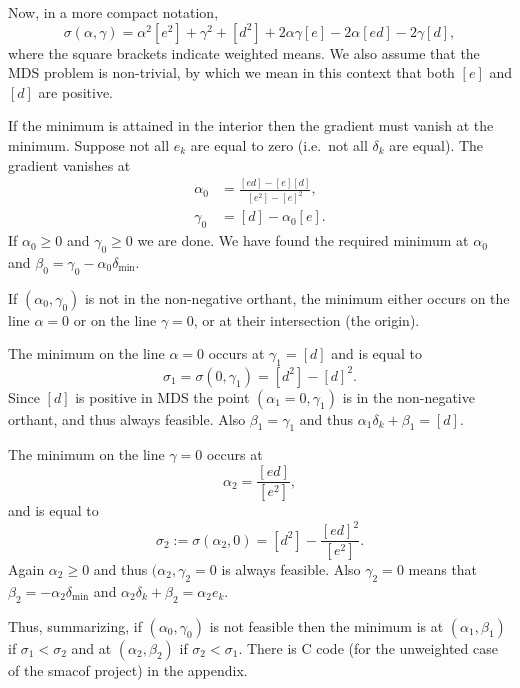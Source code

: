 \documentclass[
  12pt,
]{article}
\begin{document}
Now, in a more compact notation,
\begin{equation}
\sigma(\alpha,\gamma)=\alpha^2[e^2]+\gamma^2+[d^2]+2\alpha\gamma[e]-2\alpha[ed]-2\gamma[d],
\end{equation}
where the square brackets indicate weighted means. We also assume that the MDS problem is
non-trivial, by which we mean in this context that
both \([e]\) and \([d]\) are positive.

If the minimum is attained in the interior then the gradient
must vanish at the minimum. Suppose not all \(e_k\) are equal to zero
(i.e.~not all \(\delta_k\) are equal). The gradient vanishes at
\begin{align}
\alpha_0&=\frac{[ed]-[e][d]}{[e^2]-[e]^2},\\
\gamma_0&=[d]-\alpha_0[e].
\end{align}
If \(\alpha_0\geq 0\) and \(\gamma_0\geq 0\) we are done. We
have found the required minimum at \(\alpha_0\) and
\(\beta_0=\gamma_0-\alpha_0\delta_{\text{min}}\).

If \((\alpha_0,\gamma_0)\) is not in the non-negative orthant, the minimum
either occurs on the line \(\alpha=0\) or on the line \(\gamma=0\), or at
their intersection (the origin).

The minimum on the line \(\alpha=0\) occurs at \(\gamma_1=[d]\) and is equal
to \begin{equation}
\sigma_1=\sigma(0,\gamma_1)=[d^2]-[d]^2.
\end{equation} Since \([d]\) is positive in MDS the point \((\alpha_1=0,\gamma_1)\)
is in the non-negative orthant, and thus always feasible. Also
\(\beta_1=\gamma_1\) and thus \(\alpha_1\delta_k+\beta_1=[d]\).

The minimum on the line \(\gamma=0\) occurs at \begin{equation}
\alpha_2=\frac{[ed]}{[e^2]},
\end{equation} and is equal to \begin{equation}
\sigma_2:=\sigma(\alpha_2,0)=[d^2]-\frac{[ed]^2}{[e^2]}.
\end{equation}
Again \(\alpha_2\geq 0\) and thus \((\alpha_2,\gamma_2=0\) is always feasible.
Also \(\gamma_2=0\) means that \(\beta_2=-\alpha_2\delta_{\text{min}}\)
and \(\alpha_2\delta_k+\beta_2=\alpha_2e_k\).

Thus, summarizing, if \((\alpha_0,\gamma_0)\) is not feasible then the
minimum is at \((\alpha_1,\beta_1)\) if \(\sigma_1<\sigma_2\) and at
\((\alpha_2,\beta_2)\) if \(\sigma_2<\sigma_1\). There is C code (for the
unweighted case of the smacof project) in the appendix.
\end{document}
